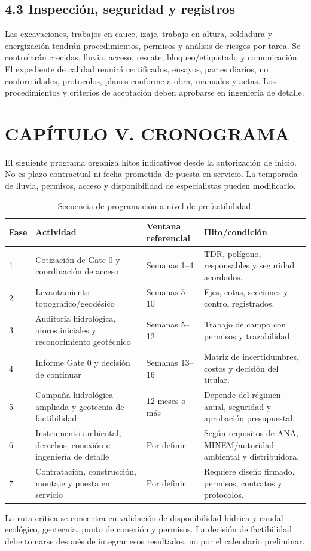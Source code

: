 \documentclass[11pt,a4paper]{article}
\newcommand{\capitulo}[2]{\clearpage\section*{CAPÍTULO #1. #2}\addcontentsline{toc}{section}{Capítulo #1. #2}}
\begin{document}
\subsection*{4.3 Inspección, seguridad y registros}
Las excavaciones, trabajos en cauce, izaje, trabajo en altura, soldadura y energización tendrán procedimientos, permisos y análisis de riesgos por tarea. Se controlarán crecidas, lluvia, acceso, rescate, bloqueo/etiquetado y comunicación. El expediente de calidad reunirá certificados, ensayos, partes diarios, no conformidades, protocolos, planos conforme a obra, manuales y actas. Los procedimientos y criterios de aceptación deben aprobarse en ingeniería de detalle.

\capitulo{V}{CRONOGRAMA}
El siguiente programa organiza hitos indicativos desde la autorización de inicio. No es plazo contractual ni fecha prometida de puesta en servicio. La temporada de lluvia, permisos, acceso y disponibilidad de especialistas pueden modificarlo.
\begin{table}[H]\centering\small
\begin{tabularx}{\textwidth}{p{1.0cm}p{4.1cm}p{2.6cm}Y}\toprule Fase & Actividad & Ventana referencial & Hito/condición\\ & Cotización de Gate 0 y coordinación de acceso & Semanas 1--4 & TDR, polígono, responsables y seguridad acordados.\\
2 & Levantamiento topográfico/geodésico & Semanas 5--10 & Ejes, cotas, secciones y control registrados.\\
3 & Auditoría hidrológica, aforos iniciales y reconocimiento geotécnico & Semanas 5--12 & Trabajo de campo con permisos y trazabilidad.\\
4 & Informe Gate 0 y decisión de continuar & Semanas 13--16 & Matriz de incertidumbres, costos y decisión del titular.\\
5 & Campaña hidrológica ampliada y geotecnia de factibilidad & 12 meses o más & Depende del régimen anual, seguridad y aprobación presupuestal.\\
6 & Instrumento ambiental, derechos, conexión e ingeniería de detalle & Por definir & Según requisitos de ANA, MINEM/autoridad ambiental y distribuidora.\\
7 & Contratación, construcción, montaje y puesta en servicio & Por definir & Requiere diseño firmado, permisos, contratos y protocolos.\\
\bottomrule\end{tabularx}\caption{Secuencia de programación a nivel de prefactibilidad.}\end{table}
La ruta crítica se concentra en validación de disponibilidad hídrica y caudal ecológico, geotecnia, punto de conexión y permisos. La decisión de factibilidad debe tomarse después de integrar esos resultados, no por el calendario preliminar.
\end{document}

